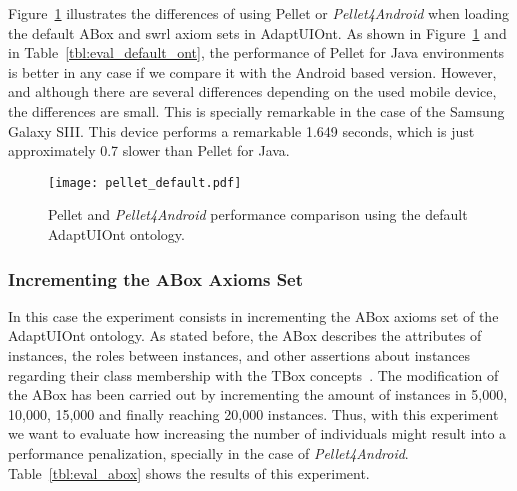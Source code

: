 Figure~\ref{fig:pellet_default} illustrates the differences of using Pellet or
\textit{Pellet4Android} when loading the default ABox and \ac{swrl} axiom sets in 
AdaptUIOnt. As shown in Figure~\ref{fig:pellet_default} and in 
Table~\ref{tbl:eval_default_ont}, the performance of Pellet for Java 
environments is better in any case if we compare it with the Android based 
version. However, and although there are several differences depending on the 
used mobile device, the differences are small. This is specially remarkable in 
the case of the Samsung Galaxy SIII. This device performs a remarkable 1.649 
seconds, which is just approximately 0.7 slower than Pellet for Java.

\begin{figure}
\centering
\texttt{[image: pellet\_default.pdf]}
\caption{Pellet and \textit{Pellet4Android} performance comparison using the
default AdaptUIOnt ontology.}
\label{fig:pellet_default}
\end{figure}

\subsubsection{Incrementing the ABox Axioms Set}
\label{sec:eval_abox}

In this case the experiment consists in incrementing the ABox axioms set of 
the AdaptUIOnt ontology. As stated before, the ABox describes the attributes of 
instances, the roles between instances, and other assertions about instances 
regarding their class membership with the TBox concepts~\citep{abox_tbox}. 
The modification of the ABox has been carried out by incrementing the amount of 
instances in 5,000, 10,000, 15,000 and finally reaching 20,000 instances. Thus, 
with this experiment we want to evaluate how increasing the number of 
individuals might result into a performance penalization, specially in the case 
of \textit{Pellet4Android}. Table~\ref{tbl:eval_abox} shows the results of this
experiment.

